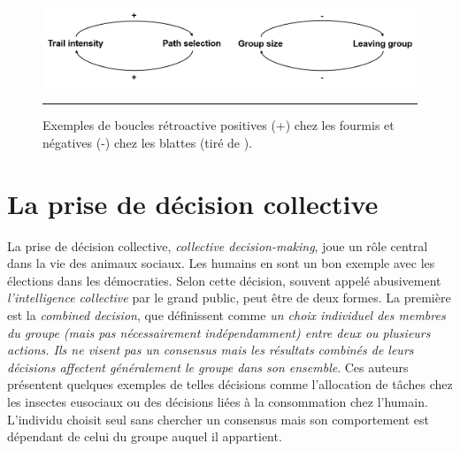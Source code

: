  \begin{figure}[ht]
	\centering
		\includegraphics[width=0.9 \textwidth]{Figures/feedback.png}
		\rule{35em}{0.5pt}
	\caption[Feedback]{Exemples de boucles rétroactive positives (+) chez les fourmis et négatives (-) chez les blattes (tiré de \citet{jeanson_positive_2009}).}
	\label{fig:feedback}   
 \end{figure}   
 
	\section{La prise de décision collective}
    \label{sec:decision}
La prise de décision collective, \textit{collective decision-making}, joue un rôle central dans la vie des animaux sociaux. Les humains en sont un bon exemple avec les élections dans les démocraties. Selon \citet{conradt_consensus_2005} cette décision, souvent appelé abusivement \textit{l'intelligence collective} par le grand public, peut être de deux formes. La première est la \textit{combined decision}, que \citet{conradt_consensus_2005} définissent comme \textit{un choix individuel des membres du groupe (mais pas nécessairement indépendamment) entre deux ou plusieurs actions. Ils ne visent pas un consensus mais les résultats combinés de leurs décisions affectent généralement le groupe dans son ensemble}\footnotemark[3]. Ces auteurs présentent quelques exemples de telles décisions comme l'allocation de tâches chez les insectes eusociaux ou des décisions liées à la consommation chez l'humain. L'individu choisit seul sans chercher un consensus mais son comportement est dépendant de celui du groupe auquel il appartient.

